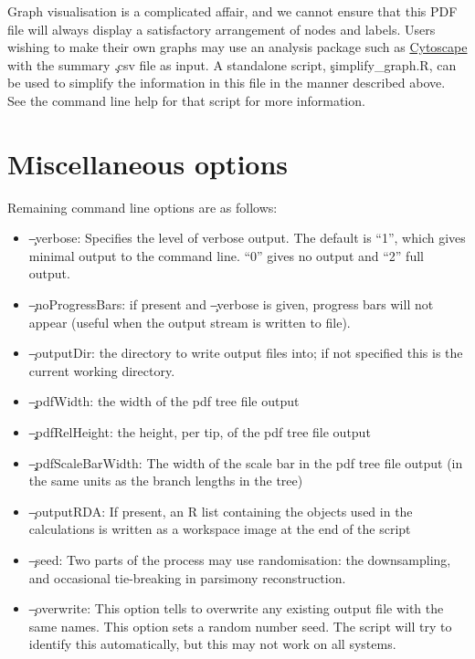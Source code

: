 Graph visualisation is a complicated affair, and we cannot ensure that this PDF file will always display a satisfactory arrangement of nodes and labels. Users wishing to make their own graphs may use an analysis package such as \href{http://www.cytoscape.org/}{Cytoscape} with the summary \c{.csv} file as input. A standalone script, \c{simplify\_graph.R}, can be used to simplify the information in this file in the manner described above. See the command line help for that script for more information.

\section{Miscellaneous options}

Remaining command line options are as follows:
\begin{itemize}
\item \c{--verbose}: Specifies the level of verbose output. The default is ``1'', which gives minimal output to the command line. ``0'' gives no output and ``2'' full output. 
\item \c{--noProgressBars}: if present and \c{--verbose} is given, progress bars will not appear (useful when the output stream is written to file).
\item \c{--outputDir}: the directory to write output files into; if not specified this is the current working directory.
\item \c{--pdfWidth}: the width of the pdf tree file output
\item \c{--pdfRelHeight}: the height, per tip, of the pdf tree file output
\item \c{--pdfScaleBarWidth}: The width of the scale bar in the pdf tree file output (in the same units as the branch lengths in the tree)
\item \c{--outputRDA}: If present, an R list containing the objects used in the calculations is written as  a workspace image at the end of the script
\item \c{--seed}: Two parts of the process may use randomisation: the downsampling, and occasional tie-breaking in parsimony reconstruction.
\item \c{--overwrite}: This option tells \pat to overwrite any existing output file with the same names.
This option sets a random number seed.
The script will try to identify this automatically, but this may not work on all systems.
\end{itemize}